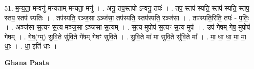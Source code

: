 \documentclass[17pt]{extarticle}
\begin{document}
51. म॒न्य॒ता॒ मन्वनु॑ मन्यताम् मन्यता॒ मनु॑ । . अनु॒ तप॒स्तपो ऽन्वनु॒ तपः॑ । . तप॒ स्तप॑ स्पति॒ स्तप॑ स्पति॒ स्तप॒ स्तप॒ स्तप॑ स्पतिः । . तप॑स्पति॒ रञ्ज॒सा ऽञ्ज॑सा॒ तप॑स्पति॒ स्तप॑स्पति॒ रञ्ज॑सा । . तप॑स्पति॒रिति॒ तपः॑ - प॒तिः॒ । . अञ्ज॑सा स॒त्यꣳ स॒त्य मञ्ज॒सा ऽञ्ज॑सा स॒त्यम् । . स॒त्य मुपोप॑ स॒त्यꣳ स॒त्य मुप॑ । . उप॑ गेषम् गेष॒ मुपोप॑ गेषम् । . गे॒ष॒(ग्म्॒) सु॒वि॒ते सु॑वि॒ते गे॑षम् गेषꣳ सुवि॒ते । . सु॒वि॒ते मा॑ मा सुवि॒ते सु॑वि॒ते मा᳚ । . मा॒ धा॒ धा॒ मा॒ मा॒ धाः॒ । . धा॒ इति॑ धाः । \newline

\textbf{Ghana Paata } \newline
\end{document}

